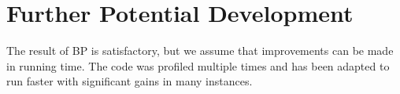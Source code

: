 \documentclass[11pt,twoside,twocolumn,a4paper]{article}
\theoremstyle{plain}
\theoremstyle{definition}
\begin{document}


\section{Further Potential Development}
The result of BP is satisfactory, but we assume that improvements can be made in running time.
The code was profiled multiple times and has been adapted to run faster with significant gains in many instances.

\end{document}
